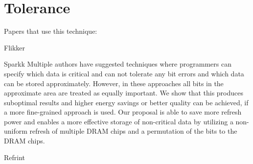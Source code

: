 \section{Tolerance} 
\label{sec:tol}

Papers that use this technique:

Flikker\cite{flikker}

Sparkk\cite{sparkk}
Multiple authors have suggested techniques where programmers can specify which data is critical and can not tolerate any bit errors and which data can be stored approximately. However, in these approaches all bits in the approximate area are treated as equally important. We show that this produces suboptimal results and higher energy savings or better quality can be achieved, if a more fine-grained approach is used. Our proposal is able to save more refresh power and enables a more effective storage of non-critical data by utilizing a non-uniform refresh of multiple DRAM chips and a permutation of the bits to the DRAM chips. 

Refrint\cite{refrint}